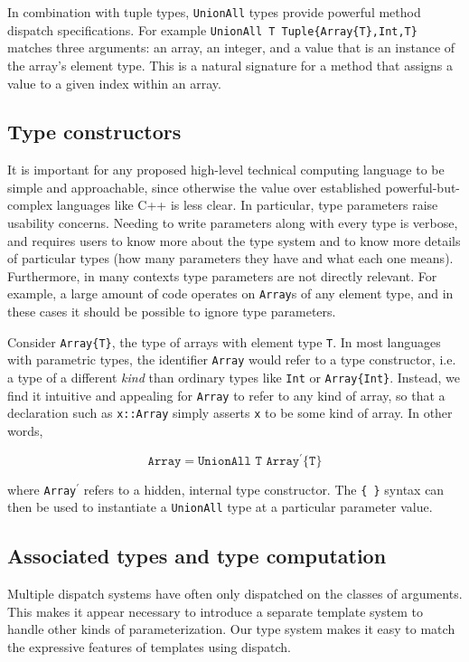 In combination with tuple types, \texttt{UnionAll} types provide powerful
method dispatch specifications. For example
\texttt{UnionAll T Tuple\{Array\{T\},Int,T\}} matches three arguments:
an array, an integer, and a value that is an instance of the array's
element type. This is a natural signature for a method that assigns a
value to a given index within an array.


\subsection{Type constructors}

It is important for any proposed high-level technical computing language to be
simple and approachable, since otherwise the value over established
powerful-but-complex languages like C++ is less clear.
In particular, type parameters raise usability concerns.
Needing to write parameters along with every type is verbose, and requires users
to know more about the type system and to know more details of particular
types (how many parameters they have and what each one means).
Furthermore, in many contexts type parameters are not directly relevant.
For example, a large amount of code operates on \texttt{Array}s of any
element type, and in these cases it should be possible to ignore type parameters.

Consider \texttt{Array\{T\}}, the type of arrays with element type \texttt{T}.
In most languages with parametric types, the identifier \texttt{Array} would
refer to a type constructor, i.e. a type of a different \emph{kind} than
ordinary types like \texttt{Int} or \texttt{Array\{Int\}}.
Instead, we find it intuitive and appealing for \texttt{Array} to refer to
any kind of array, so that a declaration such as \texttt{x::Array} simply
asserts \texttt{x} to be some kind of array. In other words,

\vspace{-3ex}
\[
\texttt{Array} = \texttt{UnionAll T Array$^\prime$\{T\}}
\]

\noindent
where \texttt{Array$^\prime$} refers to a hidden, internal type constructor.
The \texttt{\{ \}} syntax can then be used to instantiate a \texttt{UnionAll}
type at a particular parameter value.

\subsection{Associated types and type computation}

Multiple dispatch systems have often only dispatched on the classes of
arguments.
This makes it appear necessary to introduce a separate
template system to handle other kinds of parameterization.
Our type system makes it easy to match the expressive features of
templates using dispatch.


